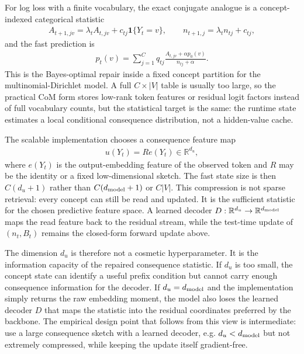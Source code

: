 For log loss with a finite vocabulary, the exact conjugate analogue is a concept-indexed categorical statistic
\begin{align*}
A_{t+1,jv}
=
\lambda_t A_{t,jv}+c_{tj}\mathbf{1}\{Y_t=v\},
\qquad
n_{t+1,j}
=
\lambda_t n_{tj}+c_{tj},
\end{align*}
and the fast prediction is
\begin{align*}
p_t(v)
=
\sum_{j=1}^{C}
q_{tj}
\frac{A_{t,jv}+\alpha p_0(v)}{n_{tj}+\alpha}.
\end{align*}
This is the Bayes-optimal repair inside a fixed concept partition for the multinomial-Dirichlet model. A full $C\times |V|$ table is usually too large, so the practical CoM form stores low-rank token features or residual logit factors instead of full vocabulary counts, but the statistical target is the same: the runtime state estimates a local conditional consequence distribution, not a hidden-value cache.

The scalable implementation chooses a consequence feature map
\begin{align*}
u(Y_t)=R e(Y_t)\in\mathbb{R}^{d_u},
\end{align*}
where $e(Y_t)$ is the output-embedding feature of the observed token and $R$ may be the identity or a fixed low-dimensional sketch. The fast state size is then $C(d_u+1)$ rather than $C(d_{\rm model}+1)$ or $C|V|$. This compression is not sparse retrieval: every concept can still be read and updated. It is the sufficient statistic for the chosen predictive feature space. A learned decoder $D:\mathbb{R}^{d_u}\to\mathbb{R}^{d_{\rm model}}$ maps the read feature back to the residual stream, while the test-time update of $(n_t,B_t)$ remains the closed-form forward update above.

The dimension $d_u$ is therefore not a cosmetic hyperparameter. It is the information capacity of the repaired consequence statistic. If $d_u$ is too small, the concept state can identify a useful prefix condition but cannot carry enough consequence information for the decoder. If $d_u=d_{\rm model}$ and the implementation simply returns the raw embedding moment, the model also loses the learned decoder $D$ that maps the statistic into the residual coordinates preferred by the backbone. The empirical design point that follows from this view is intermediate: use a large consequence sketch with a learned decoder, e.g. $d_u<d_{\rm model}$ but not extremely compressed, while keeping the update itself gradient-free.

